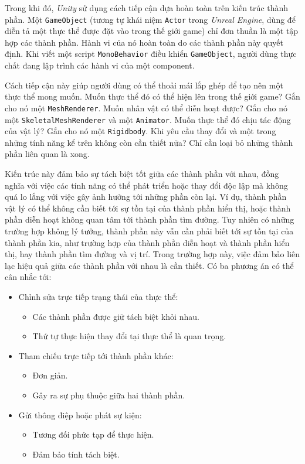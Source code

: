 \documentclass[12pt]{report}
\begin{document}
Trong khi đó, \textit{Unity} sử dụng cách tiếp cận dựa hoàn toàn trên kiến trúc thành phần. Một \texttt{GameObject} (tương tự khái niệm \texttt{Actor} trong \textit{Unreal Engine}, dùng để diễn tả một thực thể được đặt vào trong thế giới game) chỉ đơn thuần là một tập hợp các thành phần. Hành vi của nó hoàn toàn do các thành phần này quyết định. Khi viết một script \texttt{MonoBehavior} điều khiển \texttt{GameObject}, người dùng thực chất đang lập trình các hành vi của một component.

Cách tiếp cận này giúp người dùng có thể thoải mái lắp ghép để tạo nên một thực thể mong muốn. Muốn thực thể đó có thể hiện lên trong thế giới game? Gắn cho nó một \texttt{MeshRenderer}. Muốn nhân vật có thể diễn hoạt được? Gắn cho nó một \texttt{SkeletalMeshRenderer} và một \texttt{Animator}. Muốn thực thể đó chịu tác động của vật lý? Gắn cho nó một \texttt{Rigidbody}. Khi yêu cầu thay đổi và một trong những tính năng kể trên không còn cần thiết nữa? Chỉ cần loại bỏ những thành phần liên quan là xong.

Kiến trúc này đảm bảo sự tách biệt tốt giữa các thành phần với nhau, đồng nghĩa với việc các tính năng có thể phát triển hoặc thay đổi độc lập mà không quá lo lắng với việc gây ảnh hưởng tới những phần còn lại. Ví dụ, thành phần vật lý có thể không cần biết tới sự tồn tại của thành phần hiển thị, hoặc thành phần diễn hoạt không quan tâm tới thành phần tìm đường. Tuy nhiên có những trường hợp không lý tưởng, thành phần này vẫn cần phải biết tới sự tồn tại của thành phần kia, như trường hợp của thành phần diễn hoạt và thành phần hiển thị, hay thành phần tìm đường và vị trí. Trong trường hợp này, việc đảm bảo liên lạc hiệu quả giữa các thành phần với nhau là cần thiết. Có ba phương án có thể cân nhắc tới\cite{gameprogrammingpatterns}:
\begin{itemize}
	\item Chỉnh sửa trực tiếp trạng thái của thực thể:
	\begin{itemize}
		\item Các thành phần được giữ tách biệt khỏi nhau.
		\item Thứ tự thực hiện thay đổi tại thực thể là quan trọng.
	\end{itemize}
	\item Tham chiếu trực tiếp tới thành phần khác:
	\begin{itemize}
		\item Đơn giản.
		\item Gây ra sự phụ thuộc giữa hai thành phần.
	\end{itemize}
	\item Gửi thông điệp hoặc phát sự kiện:
	\begin{itemize}
		\item Tương đối phức tạp để thực hiện.
		\item Đảm bảo tính tách biệt.
	\end{itemize}
\end{itemize}
\end{document}
